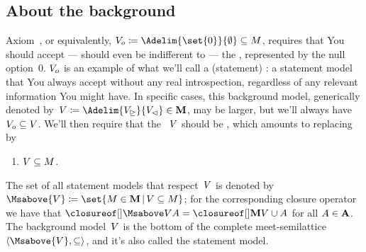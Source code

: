 \documentclass[preprint]{isipta2025}
\begin{document}
\subsection{About the background}\label{sec::background}
Axiom~, or equivalently, \(\zeroM\coloneqq\Adelim{\set{0}}{\emptyset}\subseteq\M\), requires that You should accept --- should even be indifferent to --- the , represented by the null option~\(0\).
\({V_o}\) is an example of what we'll call a  (statement) : a statement model that You always accept without any real introspection, regardless of any relevant information You might have.
In specific cases, this background model, generically denoted by~\(\bgM\coloneqq\Adelim{\bgM_\acc}{\bgM_\rej}\in\Ms\), may be larger, but we'll always have \({V_o}\subseteq V\).
We'll then require that the ~\(V\) should be , which amounts to replacing  by
\begin{enumerate}[label={\upshape M1*.},ref={\upshape M1*},leftmargin=*,itemsep=0pt]
\item\label{axiom:stronger:background:respected} \(V\subseteq M\).
\end{enumerate}
The set of all statement models that respect~\(V\) is denoted by~\(\Msabove{\bgM}\coloneqq\set{\M\in\Ms\given\bgM\subseteq\M}\); for the corresponding closure operator we have that \(\Mclsbgof{\bgM}{\A}=\Mclsof{\bgM\union\A}\) for all \(A\in\mathbf{A}\).
The background model~\(V\) is the bottom of the complete meet-semilattice \(\structure{\Msabove{\bgM},\subseteq}\), and it's also called the  statement model.
\end{document}
